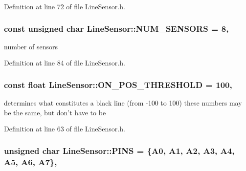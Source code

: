 Definition at line 72 of file Line\-Sensor.\-h.

\hypertarget{classLineSensor_aaf77268f123f217ce341efaaaf757a18}{
\subsubsection[{N\-U\-M\-\_\-\-S\-E\-N\-S\-O\-R\-S}]{\setlength{\rightskip}{0pt plus 5cm}const unsigned char Line\-Sensor\-::\-N\-U\-M\-\_\-\-S\-E\-N\-S\-O\-R\-S = 8\hspace{0.3cm}{\ttfamily [static]}, {\ttfamily [private]}}}\label{classLineSensor_aaf77268f123f217ce341efaaaf757a18}


number of sensors 



Definition at line 84 of file Line\-Sensor.\-h.

\hypertarget{classLineSensor_a3e3c5f134159562e56fcd06e55cc7024}{
\subsubsection[{O\-N\-\_\-\-P\-O\-S\-\_\-\-T\-H\-R\-E\-S\-H\-O\-L\-D}]{\setlength{\rightskip}{0pt plus 5cm}const float Line\-Sensor\-::\-O\-N\-\_\-\-P\-O\-S\-\_\-\-T\-H\-R\-E\-S\-H\-O\-L\-D = 100\hspace{0.3cm}{\ttfamily [static]}, {\ttfamily [private]}}}\label{classLineSensor_a3e3c5f134159562e56fcd06e55cc7024}


determines what constitutes a black line (from -\/100 to 100) these numbers may be the same, but don't have to be 



Definition at line 63 of file Line\-Sensor.\-h.

\hypertarget{classLineSensor_a4a017e267d06958d81523ac733e9835d}{
\subsubsection[{P\-I\-N\-S}]{\setlength{\rightskip}{0pt plus 5cm}unsigned char Line\-Sensor\-::\-P\-I\-N\-S = \{A0, A1, A2, A3, A4, A5, A6, A7\}\hspace{0.3cm}{\ttfamily [static]}, {\ttfamily [private]}}}\label{classLineSensor_a4a017e267d06958d81523ac733e9835d}


